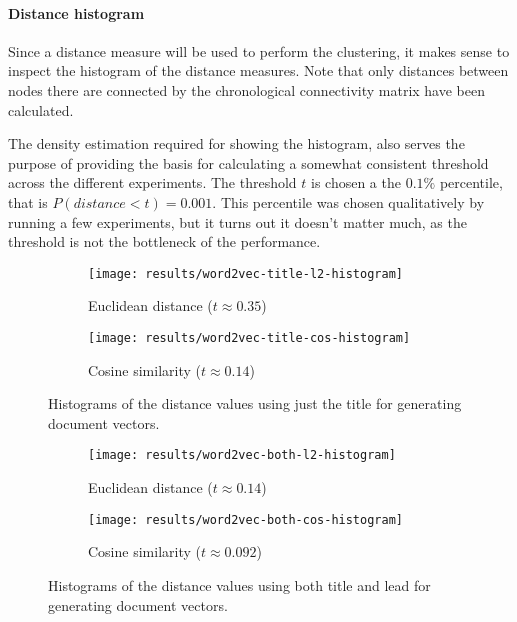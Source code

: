 \paragraph{Distance histogram} Since a distance measure will be used to perform the clustering, it makes sense to inspect the histogram of the distance measures. Note that only distances between nodes there are connected by the chronological connectivity matrix have been calculated.

The density estimation required for showing the histogram, also serves the purpose of providing the basis for calculating a somewhat consistent threshold across the different experiments. The threshold $t$ is chosen a the $0.1 \%$ percentile, that is $P(distance < t) = 0.001$. This percentile was chosen qualitatively by running a few experiments, but it turns out it doesn't matter much, as the threshold is not the bottleneck of the performance.

\begin{figure}[H]
        \centering
        \begin{subfigure}[b]{0.49\textwidth}
                \texttt{[image: results/word2vec-title-l2-histogram]}
                \caption{Euclidean distance ($t \approx 0.35$)}
        \end{subfigure}
        \begin{subfigure}[b]{0.49\textwidth}
                \texttt{[image: results/word2vec-title-cos-histogram]}
                \caption{Cosine similarity ($t \approx 0.14$)}
        \end{subfigure}
        \caption{Histograms of the distance values using just the title for generating document vectors.}
\end{figure}
\begin{figure}[H]
        \centering
        \begin{subfigure}[b]{0.49\textwidth}
                \texttt{[image: results/word2vec-both-l2-histogram]}
                \caption{Euclidean distance ($t \approx 0.14$)}
        \end{subfigure}
        \begin{subfigure}[b]{0.49\textwidth}
                \texttt{[image: results/word2vec-both-cos-histogram]}
                \caption{Cosine similarity ($t \approx 0.092$)}
        \end{subfigure}
        \caption{Histograms of the distance values using both title and lead for generating document vectors.}
\end{figure}

